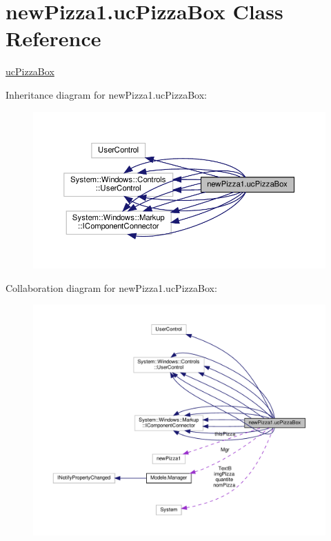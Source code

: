 \hypertarget{classnewPizza1_1_1ucPizzaBox}{}\section{new\+Pizza1.\+uc\+Pizza\+Box Class Reference}
\label{classnewPizza1_1_1ucPizzaBox}


\hyperlink{classnewPizza1_1_1ucPizzaBox}{uc\+Pizza\+Box}  




Inheritance diagram for new\+Pizza1.\+uc\+Pizza\+Box\+:
\nopagebreak
\begin{figure}[H]
\begin{center}
\leavevmode
\includegraphics[width=350pt]{classnewPizza1_1_1ucPizzaBox__inherit__graph}
\end{center}
\end{figure}


Collaboration diagram for new\+Pizza1.\+uc\+Pizza\+Box\+:
\nopagebreak
\begin{figure}[H]
\begin{center}
\leavevmode
\includegraphics[width=350pt]{classnewPizza1_1_1ucPizzaBox__coll__graph}
\end{center}
\end{figure}
